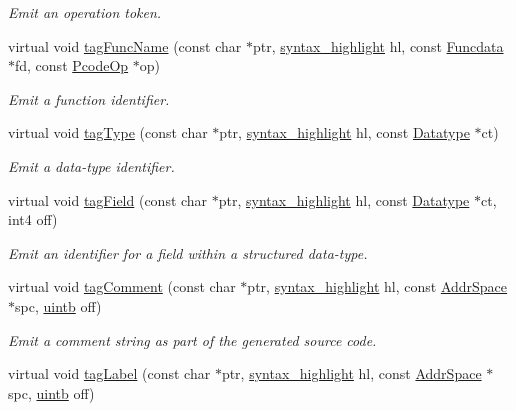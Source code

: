 \begin{DoxyCompactItemize}
\begin{DoxyCompactList}\small\item\em Emit an operation token. \end{DoxyCompactList}\item 
virtual void \mbox{\hyperlink{class_emit_xml_a735e928e65b3dbd028803b6a46262732}{tag\+Func\+Name}} (const char $\ast$ptr, \mbox{\hyperlink{class_emit_xml_a7c3577436da429c3c75f4b82cac6864f}{syntax\+\_\+highlight}} hl, const \mbox{\hyperlink{class_funcdata}{Funcdata}} $\ast$fd, const \mbox{\hyperlink{class_pcode_op}{Pcode\+Op}} $\ast$op)
\begin{DoxyCompactList}\small\item\em Emit a function identifier. \end{DoxyCompactList}\item 
virtual void \mbox{\hyperlink{class_emit_xml_a30a2ad299f5d55cde6ea94b2589c4dd7}{tag\+Type}} (const char $\ast$ptr, \mbox{\hyperlink{class_emit_xml_a7c3577436da429c3c75f4b82cac6864f}{syntax\+\_\+highlight}} hl, const \mbox{\hyperlink{class_datatype}{Datatype}} $\ast$ct)
\begin{DoxyCompactList}\small\item\em Emit a data-\/type identifier. \end{DoxyCompactList}\item 
virtual void \mbox{\hyperlink{class_emit_xml_a2494b76d6f02bd0848af3f72b8def6e3}{tag\+Field}} (const char $\ast$ptr, \mbox{\hyperlink{class_emit_xml_a7c3577436da429c3c75f4b82cac6864f}{syntax\+\_\+highlight}} hl, const \mbox{\hyperlink{class_datatype}{Datatype}} $\ast$ct, int4 off)
\begin{DoxyCompactList}\small\item\em Emit an identifier for a field within a structured data-\/type. \end{DoxyCompactList}\item 
virtual void \mbox{\hyperlink{class_emit_xml_a428017b98649ae577c5cde259af566eb}{tag\+Comment}} (const char $\ast$ptr, \mbox{\hyperlink{class_emit_xml_a7c3577436da429c3c75f4b82cac6864f}{syntax\+\_\+highlight}} hl, const \mbox{\hyperlink{class_addr_space}{Addr\+Space}} $\ast$spc, \mbox{\hyperlink{types_8h_a2db313c5d32a12b01d26ac9b3bca178f}{uintb}} off)
\begin{DoxyCompactList}\small\item\em Emit a comment string as part of the generated source code. \end{DoxyCompactList}\item 
virtual void \mbox{\hyperlink{class_emit_xml_a647841bd4102de3af8ca0f8dd734ac6b}{tag\+Label}} (const char $\ast$ptr, \mbox{\hyperlink{class_emit_xml_a7c3577436da429c3c75f4b82cac6864f}{syntax\+\_\+highlight}} hl, const \mbox{\hyperlink{class_addr_space}{Addr\+Space}} $\ast$spc, \mbox{\hyperlink{types_8h_a2db313c5d32a12b01d26ac9b3bca178f}{uintb}} off)

\end{DoxyCompactItemize}

